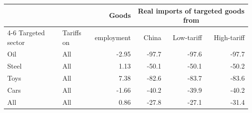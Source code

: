 \begin{tabular}{llrrrr}
\toprule
 & & Goods & \multicolumn{3}{c}{Real imports of targeted goods from} \\
\cmidrule(lr){4-6}
Targeted sector & Tariffs on & employment & China & Low-tariff & High-tariff \\
\midrule
Oil & All & -2.95 & -97.7 & -97.6 & -97.7 \\
\midrule
Steel & All & 1.13 & -50.1 & -50.1 & -50.2 \\
\midrule
Toys & All & 7.38 & -82.6 & -83.7 & -83.6 \\
\midrule
Cars & All & -1.66 & -40.2 & -39.9 & -40.2 \\
\midrule
All & All & 0.86 & -27.8 & -27.1 & -31.4 \\
\bottomrule
\end{tabular}
